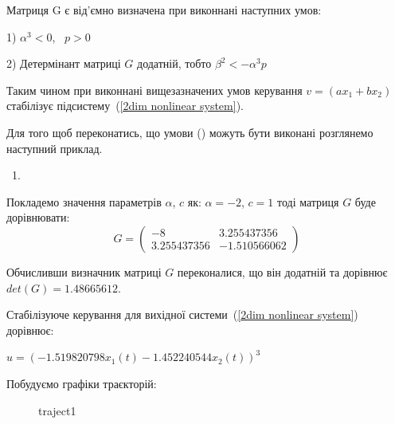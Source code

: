\documentclass{article}
\begin{document}
Матриця G є від'ємно визначена при виконнані наступних умов:

1) $\alpha^3 < 0$, ~$p > 0$

2) Детермінант матриці $G$ додатній, тобто $\beta^2<-\alpha^3p$


Таким чином при виконнані вищезазначених умов 
керування $ v=(ax_1+bx_2)$ стабілізує підсистему~(\ref{2dim nonlinear system}).

Для того щоб переконатись, що умови () можуть бути виконані розглянемо наступний 
приклад. 

{~1}.

Покладемо значення параметрів $\alpha$, $c$ як: $\alpha = -2$, $c = 1$
тоді матриця $G$ буде дорівнювати:
\begin{equation}
    G=\left(\begin{array}{clr}
        -8 & 3.255437356\\
        3.255437356 & -1.510566062
    \end{array}\right) 
    \end{equation}

Обчисливши визначник матриці $G$ переконалися, що він додатній та дорівнює $det(G)=1.48665612$.

Стабілізуюче керування для вихідної системи~(\ref{2dim nonlinear system})
дорівнює:

$u = (-1.519820798x_1(t)-1.452240544x_2(t))^3$

Побудуємо графіки траєкторій:
\begin{figure}[h]
    \caption{traject1}
    \label{fig:image1}
\end{figure}
\end{document}
